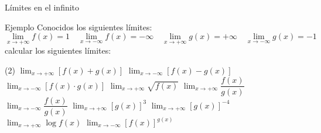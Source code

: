 \documentclass[8pt]{beamer}
\newcommand{\limite}[2]{\displaystyle \lim_{x \rightarrow #1}{#2}}
\begin{document}
\begin{frame}{Límites en el infinito}
\begin{exampleblock}{Ejemplo}
Conocidos los siguientes límites:
\[ \limite{+\infty}{f(x)}=1 \quad \limite{-\infty}{f(x)}=-\infty \quad \limite{+\infty}{g(x)}=+\infty \quad \limite{-\infty}{g(x)}=-1 \]
calcular los siguientes límites:
\begin{tasks}[label=\alph*)](2)
\task $\limite{+\infty}{\left[ f(x)+g(x) \right] }$
\task $\limite{-\infty}{\left[ f(x)-g(x) \right] }$
\task $\limite{-\infty}{\left[ f(x)\cdot g(x) \right] }$
\task $\limite{+\infty}{\sqrt{ f(x)} }$
\task $\limite{+\infty}{\dfrac{f(x)}{g(x)} }$
\task $\limite{-\infty}{\dfrac{f(x)}{g(x)} }$
\task $\limite{+\infty}{\left[ g(x) \right]^3 }$
\task $\limite{+\infty}{\left[ g(x) \right]^{-4} }$
\task $\limite{+\infty}{\log f(x) }$
\task $\limite{-\infty}{\left[ f(x) \right]^{g(x)} }$
\end{tasks}
\end{exampleblock}
\end{frame}
\end{document}
